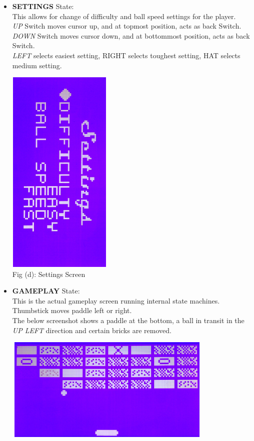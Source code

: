 \documentclass{article}
\begin{document}
\begin{itemize}
\begin{center}
  \end{center}
  \item \textbf{SETTINGS} State: \\ \qquad This allows for change of difficulty and ball speed settings for the player.
  \\ \textit{UP} Switch moves cursor up, and at topmost position, acts as back Switch.
  \\ \textit{DOWN} Switch moves cursor down, and at bottommost position, acts as back Switch.
  \\ \textit{LEFT} selects easiest setting, RIGHT selects toughest setting, HAT selects medium setting.
  \begin{center}
  \includegraphics[width=5cm, height=10cm, angle = 90]{Images/settingsScreen} \\
  {\small Fig (d): Settings Screen} \\
  \end{center}
  \item \textbf{GAMEPLAY} State: \\ \qquad This is the actual gameplay screen running internal state machines.
  \\ Thumbstick moves paddle left or right.
  \\ The below screenshot shows a paddle at the bottom, a ball in transit in the \textit{UP LEFT} direction and certain bricks are removed.
  \begin{center}
  \includegraphics[width=10cm, height = 5cm]{Images/gameplayScreen} \\

\end{center}
\end{itemize}
\end{document}
